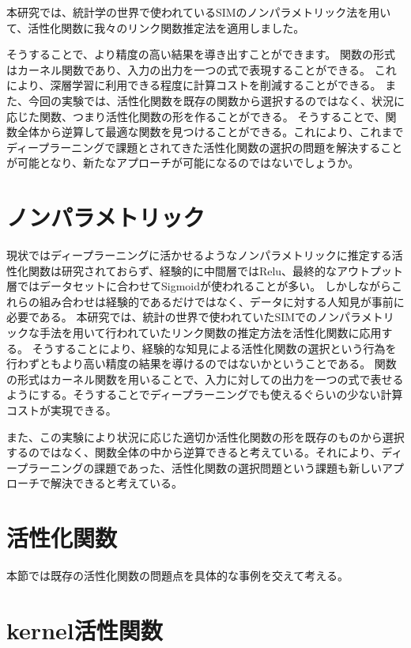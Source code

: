 本研究では、統計学の世界で使われているSIMのノンパラメトリック法を用いて、活性化関数に我々のリンク関数推定法を適用しました。


そうすることで、より精度の高い結果を導き出すことができます。
関数の形式はカーネル関数であり、入力の出力を一つの式で表現することができる。
これにより、深層学習に利用できる程度に計算コストを削減することができる。
また、今回の実験では、活性化関数を既存の関数から選択するのではなく、状況に応じた関数、つまり活性化関数の形を作ることができる。
そうすることで、関数全体から逆算して最適な関数を見つけることができる。これにより、これまでディープラーニングで課題とされてきた活性化関数の選択の問題を解決することが可能となり、新たなアプローチが可能になるのではないでしょうか。


\section{ノンパラメトリック}


現状ではディープラーニングに活かせるようなノンパラメトリックに推定する活性化関数は研究されておらず、経験的に中間層ではRelu、最終的なアウトプット層ではデータセットに合わせてSigmoidが使われることが多い。
しかしながらこれらの組み合わせは経験的であるだけではなく、データに対する人知見が事前に必要である。
本研究では、統計の世界で使われていたSIMでのノンパラメトリックな手法を用いて行われていたリンク関数の推定方法を活性化関数に応用する。
そうすることにより、経験的な知見による活性化関数の選択という行為を行わずともより高い精度の結果を導けるのではないかということである。
関数の形式はカーネル関数を用いることで、入力に対しての出力を一つの式で表せるようにする。そうすることでディープラーニングでも使えるぐらいの少ない計算コストが実現できる。


また、この実験により状況に応じた適切か活性化関数の形を既存のものから選択するのではなく、関数全体の中から逆算できると考えている。それにより、ディープラーニングの課題であった、活性化関数の選択問題という課題も新しいアプローチで解決できると考えている。


\section{活性化関数}
本節では既存の活性化関数の問題点を具体的な事例を交えて考える。


\section{kernel活性関数}



